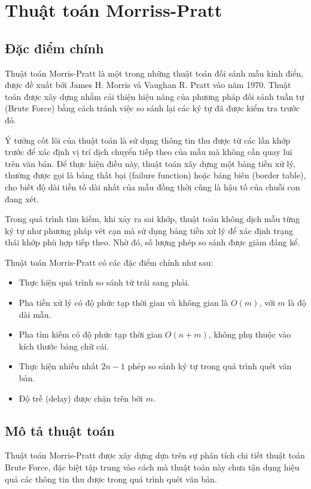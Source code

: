 \section{Thuật toán Morriss-Pratt}
\subsection{Đặc điểm chính}


Thuật toán Morris-Pratt là một trong những thuật toán đối sánh mẫu kinh điển, được đề xuất bởi James H. Morris và Vaughan R. Pratt vào năm 1970. Thuật toán được xây dựng nhằm cải thiện hiệu năng của phương pháp đối sánh tuần tự (Brute Force) bằng cách tránh việc so sánh lại các ký tự đã được kiểm tra trước đó.

Ý tưởng cốt lõi của thuật toán là sử dụng thông tin thu được từ các lần khớp trước để xác định vị trí dịch chuyển tiếp theo của mẫu mà không cần quay lui trên văn bản. Để thực hiện điều này, thuật toán xây dựng một bảng tiền xử lý, thường được gọi là bảng thất bại (failure function) hoặc bảng biên (border table), cho biết độ dài tiền tố dài nhất của mẫu đồng thời cũng là hậu tố của chuỗi con đang xét.

Trong quá trình tìm kiếm, khi xảy ra sai khớp, thuật toán không dịch mẫu từng ký tự như phương pháp vét cạn mà sử dụng bảng tiền xử lý để xác định trạng thái khớp phù hợp tiếp theo. Nhờ đó, số lượng phép so sánh được giảm đáng kể.

Thuật toán Morris-Pratt có các đặc điểm chính như sau:

\begin{itemize}
    \item Thực hiện quá trình so sánh từ trái sang phải.
    
    \item Pha tiền xử lý có độ phức tạp thời gian và không gian là \(O(m)\), với \(m\) là độ dài mẫu.
    
    \item Pha tìm kiếm có độ phức tạp thời gian \(O(n + m)\), không phụ thuộc vào kích thước bảng chữ cái.
    
    \item Thực hiện nhiều nhất \(2n - 1\) phép so sánh ký tự trong quá trình quét văn bản.
    
    \item Độ trễ (delay) được chặn trên bởi \(m\).
\end{itemize}

\subsection{Mô tả thuật toán}
Thuật toán Morris-Pratt được xây dựng dựa trên sự phân tích chi tiết thuật toán Brute Force, đặc biệt tập trung vào cách mà thuật toán này chưa tận dụng hiệu quả các thông tin thu được trong quá trình quét văn bản.

